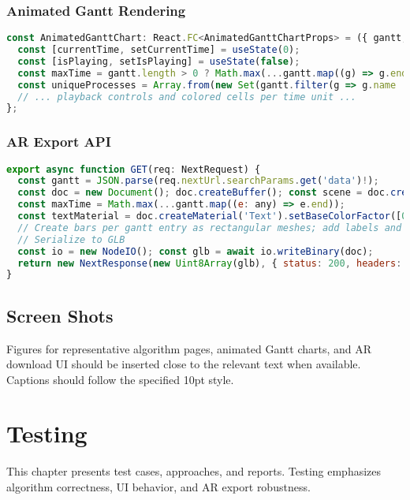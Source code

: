 \documentclass[12pt,a4paper,oneside]{report}
\begin{document}
\subsection*{Animated Gantt Rendering}
\begin{lstlisting}[language=JavaScript, caption={Animated Gantt chart (excerpt from \texttt{src/components/AnimatedGanttChart.tsx}).}]
const AnimatedGanttChart: React.FC<AnimatedGanttChartProps> = ({ gantt, colorScheme, algorithm = "Scheduling" }) => {
  const [currentTime, setCurrentTime] = useState(0);
  const [isPlaying, setIsPlaying] = useState(false);
  const maxTime = gantt.length > 0 ? Math.max(...gantt.map((g) => g.end)) : 10;
  const uniqueProcesses = Array.from(new Set(gantt.filter(g => g.name !== "Idle").map(g => g.name)));
  // ... playback controls and colored cells per time unit ...
};
\end{lstlisting}

\subsection*{AR Export API}
\begin{lstlisting}[language=JavaScript, caption={API route generating GLB from Gantt data (excerpt from \texttt{src/app/api/gantt-model/route.ts}).}]
export async function GET(req: NextRequest) {
  const gantt = JSON.parse(req.nextUrl.searchParams.get('data')!);
  const doc = new Document(); doc.createBuffer(); const scene = doc.createScene('Gantt');
  const maxTime = Math.max(...gantt.map((e: any) => e.end));
  const textMaterial = doc.createMaterial('Text').setBaseColorFactor([0.05,0.05,0.05,1]);
  // Create bars per gantt entry as rectangular meshes; add labels and markers
  // Serialize to GLB
  const io = new NodeIO(); const glb = await io.writeBinary(doc);
  return new NextResponse(new Uint8Array(glb), { status: 200, headers: { 'Content-Type': 'model/gltf-binary' } });
}
\end{lstlisting}

\section{Screen Shots}
Figures for representative algorithm pages, animated Gantt charts, and AR download UI should be inserted close to the relevant text when available. Captions should follow the specified 10pt style.

\chapter{Testing}
\noindent This chapter presents test cases, approaches, and reports. Testing emphasizes algorithm correctness, UI behavior, and AR export robustness.
\end{document}
